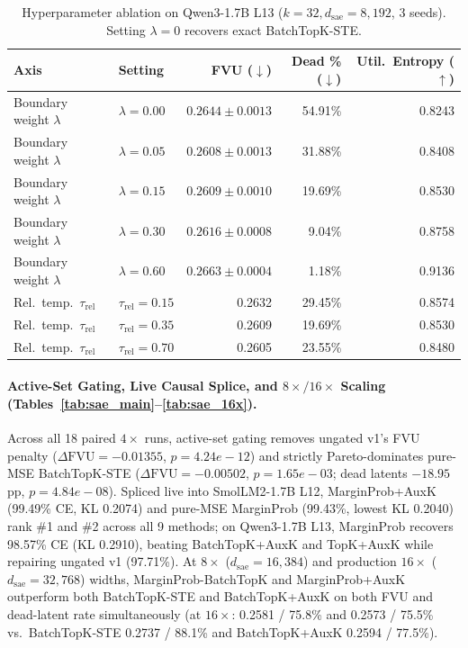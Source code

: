 \documentclass[10pt,twocolumn]{article}
\begin{document}
\begin{table}[t]
  \centering
  \caption{Hyperparameter ablation on Qwen3-1.7B L13 ($k=32, d_{\mathrm{sae}}=8{,}192$, 3 seeds). Setting $\lambda=0$ recovers exact BatchTopK-STE.}
  \label{tab:sae_ablation}
  \scriptsize
  \begin{tabular}{llrrr}
    \toprule
    Axis & Setting & FVU ($\downarrow$) & Dead \% ($\downarrow$) & Util.\ Entropy ($\uparrow$) \\
    \midrule
        Boundary weight $\lambda$ & $\lambda=0.00$ & $0.2644\pm0.0013$ & 54.91\% & 0.8243 \\
    Boundary weight $\lambda$ & $\lambda=0.05$ & $0.2608\pm0.0013$ & 31.88\% & 0.8408 \\
    Boundary weight $\lambda$ & $\lambda=0.15$ & $0.2609\pm0.0010$ & 19.69\% & 0.8530 \\
    Boundary weight $\lambda$ & $\lambda=0.30$ & $0.2616\pm0.0008$ & 9.04\% & 0.8758 \\
    Boundary weight $\lambda$ & $\lambda=0.60$ & $0.2663\pm0.0004$ & 1.18\% & 0.9136 \\
    \midrule
    Rel.\ temp.\ $\tau_{\mathrm{rel}}$ & $\tau_{\mathrm{rel}}=0.15$ & 0.2632 & 29.45\% & 0.8574 \\
    Rel.\ temp.\ $\tau_{\mathrm{rel}}$ & $\tau_{\mathrm{rel}}=0.35$ & 0.2609 & 19.69\% & 0.8530 \\
    Rel.\ temp.\ $\tau_{\mathrm{rel}}$ & $\tau_{\mathrm{rel}}=0.70$ & 0.2605 & 23.55\% & 0.8480 \\
    \bottomrule
  \end{tabular}
\end{table}

\paragraph{Active-Set Gating, Live Causal Splice, and $8\times/16\times$ Scaling (Tables~\ref{tab:sae_main}--\ref{tab:sae_16x}).} Across all 18 paired $4\times$ runs, active-set gating removes ungated v1's FVU penalty ($\Delta\mathrm{FVU} = -0.01355$, $p=4.24e-12$) and strictly Pareto-dominates pure-MSE BatchTopK-STE ($\Delta\mathrm{FVU} = -0.00502$, $p=1.65e-03$; dead latents $-18.95$\,pp, $p=4.84e-08$). Spliced live into SmolLM2-1.7B L12, MarginProb+AuxK (99.49\% CE, KL 0.2074) and pure-MSE MarginProb (99.43\%, lowest KL 0.2040) rank \#1 and \#2 across all 9 methods; on Qwen3-1.7B L13, MarginProb recovers 98.57\% CE (KL 0.2910), beating BatchTopK+AuxK and TopK+AuxK while repairing ungated v1 (97.71\%). At $8\times$ ($d_{\mathrm{sae}}=16{,}384$) and production $16\times$ ($d_{\mathrm{sae}}=32{,}768$) widths, MarginProb-BatchTopK and MarginProb+AuxK outperform both BatchTopK-STE and BatchTopK+AuxK on both FVU and dead-latent rate simultaneously (at $16\times$: 0.2581 / 75.8\% and 0.2573 / 75.5\% vs.\ BatchTopK-STE 0.2737 / 88.1\% and BatchTopK+AuxK 0.2594 / 77.5\%).
\end{document}
